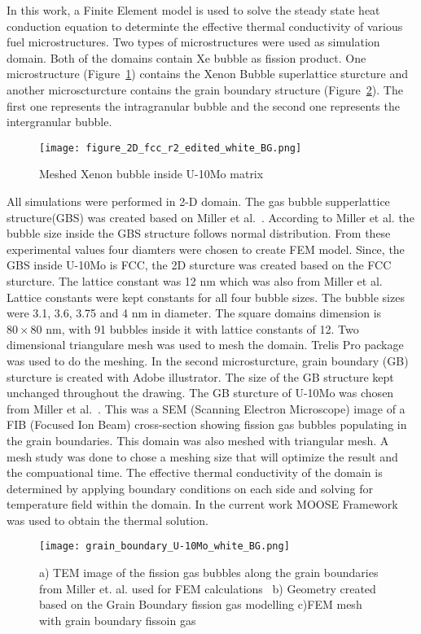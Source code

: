 \begin{doublespacing}
In this work, a Finite Element model is used to solve the steady state heat conduction equation to determinte the effective thermal conductivity of various fuel microstructures. Two types of microstructures were used as simulation domain. Both of the domains contain Xe bubble as fission product. One microstructure (Figure~\ref{fcc_mesh}) contains the Xenon Bubble superlattice sturcture and another microscturcture contains the grain boundary structure (Figure~\ref{fig_Xe_K}). The first one represents the intragranular bubble and the second one represents the intergranular bubble.
\begin{figure}
\centering
\texttt{[image: figure\_2D\_fcc\_r2\_edited\_white\_BG.png]}
\caption{Meshed Xenon bubble inside U-10Mo matrix}
\label{fcc_mesh}
\end{figure}
All simulations were performed in 2-D domain. The gas bubble supperlattice structure(GBS) was created based on Miller et al.~\cite{miller2015transmission}. According to Miller et al. the bubble size inside the GBS structure follows normal distribution. From these experimental values four diamters were chosen to create FEM model. Since, the GBS inside U-10Mo is FCC, the 2D sturcture was created based on the FCC sturcture. The lattice constant was 12 nm which was also from Miller et al. Lattice constants were kept constants for all four bubble sizes. The bubble sizes were 3.1, 3.6, 3.75 and 4 nm in diameter. The square domains dimension is $80\times80$ nm, with 91 bubbles inside it with lattice constants of 12. Two dimensional triangulare mesh was used to mesh the domain. Trelis Pro package was used to do the meshing. In the second microsturcture, grain boundary (GB) sturcture is created with Adobe illustrator. The size of the GB structure kept unchanged throughout the drawing. The GB sturcture of U-10Mo was chosen from Miller et al.~\cite{miller2012advantages}. This was a SEM (Scanning Electron Microscope) image of a FIB (Focused Ion Beam) cross-section showing fission gas bubbles populating in the grain boundaries. This domain was also meshed with triangular mesh. A mesh study was done to chose a meshing size that will optimize the result and the compuational time. The effective thermal conductivity of the domain is determined by applying boundary conditions on each side  and solving for temperature field within the domain. In the current work MOOSE Framework~\cite{gaston2009moose} was used to obtain the thermal solution.

\begin{figure}[H]
\centering
\texttt{[image: grain\_boundary\_U-10Mo\_white\_BG.png]}
\caption{a) TEM image of the fission gas bubbles along the grain boundaries from Miller et. al. used for FEM calculations~\cite{miller2012advantages} b) Geometry created based on the Grain Boundary fission gas modelling c)FEM mesh with grain boundary fissoin gas }
\label{fig_Xe_K}
\end{figure}




\end{doublespacing}
